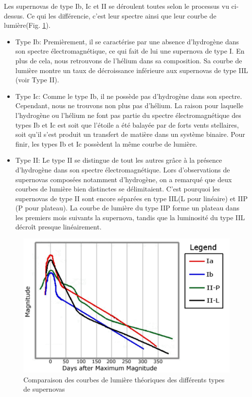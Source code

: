 Les supernovas de type Ib, Ic et II se déroulent toutes selon le processus vu ci-dessus. Ce qui les différencie, c'est leur spectre ainsi que leur courbe de lumière\footnotemark[1] (Fig. \ref{Fig. 3.1}).\bigskip

\begin{itemize}
	
	\item Type Ib: Premièrement, il se caractérise par une absence d'hydrogène dans son spectre électromagnétique, ce qui fait de lui une supernova de type I. En plus de cela, nous retrouvons de l'hélium dans sa composition. Sa courbe de lumière montre un taux de décroissance inférieure aux supernovas de type IIL (voir Type II).
	
	\item Type Ic: Comme le type Ib, il ne possède pas d'hydrogène dans son spectre. Cependant, nous ne trouvons non plus pas d'hélium. La raison pour laquelle l'hydrogène ou l'hélium ne font pas partie du spectre électromagnétique des types Ib et Ic est soit que l'étoile a été balayée par de forts vents stellaires, soit qu'il s'est produit un transfert de matière dans un système binaire. Pour finir, les types Ib et Ic possèdent la même courbe de lumière.
	
	\item Type II: Le type II se distingue de tout les autres grâce à la présence d'hydrogène dans son spectre électromagnétique. Lors d'observations de supernovas composées notamment d'hydrogène, on a remarqué que deux courbes de lumière bien distinctes se délimitaient. C'est pourquoi les supernovas de type II sont encore séparées en type IIL(L pour linéaire) et IIP (P pour plateau). La courbe de lumière du type IIP forme un plateau dans les premiers mois suivants la supernova, tandis que la luminosité du type IIL décroît presque linéairement.
	
\end{itemize}

\begin{figure}[H]
	\centering
	\includegraphics[scale=0.33]{images/lightcurves}
	\caption[Comparaison des courbes de lumière théoriques des différents types de supernovas \label{Fig. 3.1}\newline \url{http://www.talkorigins.org/faqs/supernova/}]{Comparaison des courbes de lumière théoriques des différents types de supernovas \label{Fig. 3.1}}
	\label{Fig. 3.1}
\end{figure}

